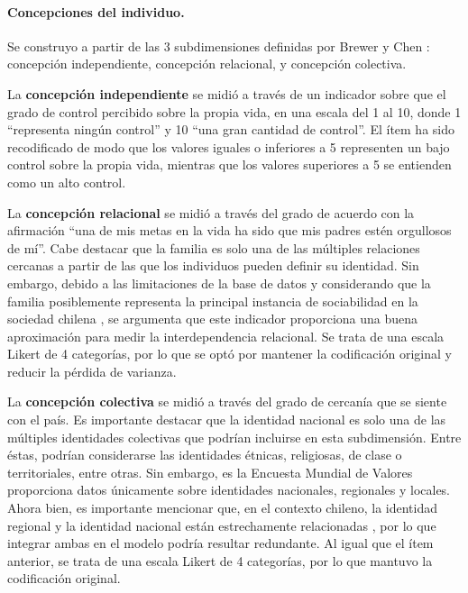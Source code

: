 \documentclass[12pt,twoside]{templates/facsothesis}
\begin{document}
\hypertarget{concepciones-del-individuo.}{%
\paragraph*{Concepciones del individuo.}\label{concepciones-del-individuo.}}

Se construyo a partir de las 3 subdimensiones definidas por Brewer y Chen \citeyearpar{brewer2007}: concepción independiente, concepción relacional, y concepción colectiva.

La \textbf{concepción independiente} se midió a través de un indicador sobre que el grado de control percibido sobre la propia vida, en una escala del 1 al 10, donde 1 ``representa ningún control'' y 10 ``una gran cantidad de control''. El ítem ha sido recodificado de modo que los valores iguales o inferiores a 5 representen un bajo control sobre la propia vida, mientras que los valores superiores a 5 se entienden como un alto control.

La \textbf{concepción relacional} se midió a través del grado de acuerdo con la afirmación ``una de mis metas en la vida ha sido que mis padres estén orgullosos de mí''. Cabe destacar que la familia es solo una de las múltiples relaciones cercanas a partir de las que los individuos pueden definir su identidad. Sin embargo, debido a las limitaciones de la base de datos y considerando que la familia posiblemente representa la principal instancia de sociabilidad en la sociedad chilena \citep{araujo2012}, se argumenta que este indicador proporciona una buena aproximación para medir la interdependencia relacional. Se trata de una escala Likert de 4 categorías, por lo que se optó por mantener la codificación original y reducir la pérdida de varianza.

La \textbf{concepción colectiva} se midió a través del grado de cercanía que se siente con el país. Es importante destacar que la identidad nacional es solo una de las múltiples identidades colectivas que podrían incluirse en esta subdimensión. Entre éstas, podrían considerarse las identidades étnicas, religiosas, de clase o territoriales, entre otras. Sin embargo, es la Encuesta Mundial de Valores proporciona datos únicamente sobre identidades nacionales, regionales y locales. Ahora bien, es importante mencionar que, en el contexto chileno, la identidad regional y la identidad nacional están estrechamente relacionadas \citep{zuniga2010}, por lo que integrar ambas en el modelo podría resultar redundante. Al igual que el ítem anterior, se trata de una escala Likert de 4 categorías, por lo que mantuvo la codificación original.
\end{document}
